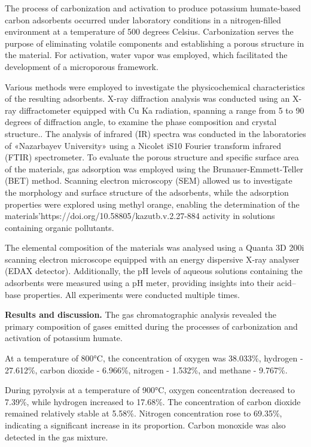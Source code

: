 \begin{multicols}{2}
The process of carbonization and activation to produce potassium
humate-based carbon adsorbents occurred under laboratory conditions in a
nitrogen-filled environment at a temperature of 500 degrees Celsius.
Carbonization serves the purpose of eliminating volatile components and
establishing a porous structure in the material. For activation, water
vapor was employed, which facilitated the development of a microporous
framework.

Various methods were employed to investigate the physicochemical
characteristics of the resulting adsorbents. X-ray diffraction analysis
was conducted using an X-ray diffractometer equipped with Cu Ka
radiation, spanning a range from 5 to 90 degrees of diffraction angle,
to examine the phase composition and crystal structure.. The analysis of
infrared (IR) spectra was conducted in the laboratories of «Nazarbayev
University» using a Nicolet iS10 Fourier transform infrared (FTIR)
spectrometer. To evaluate the porous structure and specific surface area
of the materials, gas adsorption was employed using the
Brunauer-Emmett-Teller (BET) method. Scanning electron microscopy (SEM)
allowed us to investigate the morphology and surface structure of the
adsorbents, while the adsorption properties were explored using methyl
orange, enabling the determination of the materials'{https://doi.org/10.58805/kazutb.v.2.27-884}
activity in solutions containing organic pollutants.

The elemental composition of the materials was analysed using a Quanta
3D 200i scanning electron microscope equipped with an energy dispersive
X-ray analyser (EDAX detector). Additionally, the pH levels of aqueous
solutions containing the adsorbents were measured using a pH meter,
providing insights into their acid--base properties. All experiments
were conducted multiple times.

{\bfseries Results and discussion.} The gas chromatographic analysis
revealed the primary composition of gases emitted during the processes
of carbonization and activation of potassium humate.

At a temperature of 800°C, the concentration of oxygen was 38.033\%,
hydrogen - 27.612\%, carbon dioxide - 6.966\%, nitrogen - 1.532\%, and
methane - 9.767\%.

During pyrolysis at a temperature of 900°C, oxygen concentration
decreased to 7.39\%, while hydrogen increased to 17.68\%. The
concentration of carbon dioxide remained relatively stable at 5.58\%.
Nitrogen concentration rose to 69.35\%, indicating a significant
increase in its proportion. Carbon monoxide was also detected in the gas
mixture.


\end{multicols}
